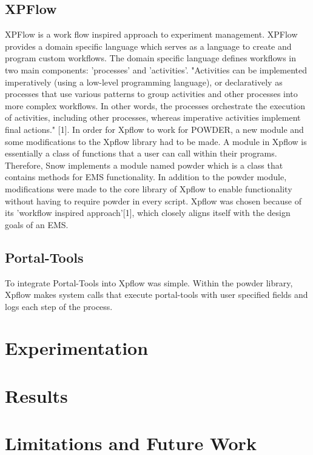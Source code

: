 \documentclass[12pt, letterpaper]{article}
\begin{document}
\begin{multicols}{2}
\subsection{XPFlow}
\quad XPFlow is a work flow inspired approach to experiment management.  XPFlow provides a domain specific language which serves as a language to create and program custom workflows.  The domain specific language defines workflows in two main components: 'processes' and 'activities'.  "Activities can be implemented imperatively (using a low-level programming language), or declaratively as processes that use various patterns to group activities and other processes into more complex workflows. In other words, the processes orchestrate the execution of activities, including other processes, whereas imperative activities implement final actions." [1].   \newline
\quad In order for Xpflow to work for POWDER, a new module and some modifications to the Xpflow library had to be made. A module in Xpflow is essentially a class of functions that a user can call within their programs.  Therefore, Snow implements a module named powder which is a class that contains methods for EMS functionality. In addition to the powder module, modifications were made to the core library of Xpflow to enable functionality without having to require powder in every script. Xpflow was chosen because of its 'workflow inspired approach'[1], which closely aligns itself with the design goals of an EMS. 
\subsection{Portal-Tools}
\quad To integrate Portal-Tools into Xpflow was simple.  Within the powder library, Xpflow makes system calls that execute portal-tools with user specified fields and logs each step of the process. \newline
\section{Experimentation}
\section{Results}
\section{Limitations and Future Work}


\end{multicols}
\end{document}
